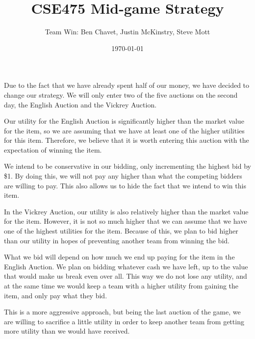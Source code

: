 \documentclass{article}
\title{CSE475 Mid-game Strategy}
\author{Team Win: Ben Chavet, Justin McKinstry, Steve Mott}
\date{\today}
\begin{document}
\maketitle

Due to the fact that we have already spent half of our money, we have decided
to change our strategy.  We will only enter two of the five auctions on the
second day, the English Auction and the Vickrey Auction.

Our utility for the English Auction is significantly higher than the market
value for the item, so we are assuming that we have at least one of the
higher utilities for this item.  Therefore, we believe that it is worth
entering this auction with the expectation of winning the item.

We intend to be conservative in our bidding, only incrementing the highest
bid by \$1.  By doing this, we will not pay any higher than what the competing
bidders are willing to pay.  This also allows us to hide the fact that we
intend to win this item.

In the Vickrey Auction, our utility is also relatively higher than the
market value for the item.  However, it is not so much higher that we can
assume that we have one of the highest utilities for the item.  Because
of this, we plan to bid higher than our utility in hopes of preventing
another team from winning the bid.

What we bid will depend on how much we end up paying for the item in the 
English Auction.  We plan on bidding whatever cash we have left, up to
the value that would make us break even over all.  This way we do not lose
any utility, and at the same time we would keep a team with a higher utility
from gaining the item, and only pay what they bid.

This is a more aggressive approach, but being the last auction of the game,
we are willing to sacrifice a little utility in order to keep another team
from getting more utility than we would have received.
\end{document}
